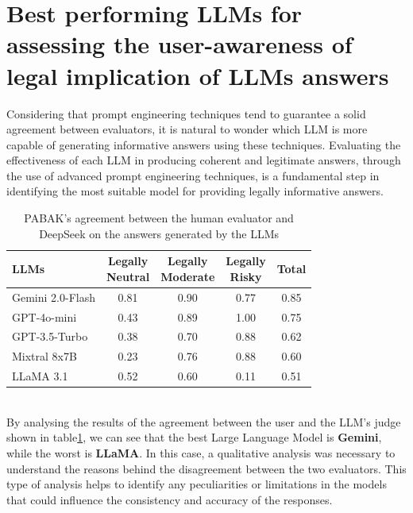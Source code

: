 \section{Best performing LLMs for assessing the user-awareness of legal implication of LLMs answers}
\label{sec:LLMwork}
Considering that prompt engineering techniques tend to guarantee a solid agreement between evaluators, it is natural to wonder which LLM is more capable of generating informative answers using these techniques. Evaluating the effectiveness of each LLM in producing coherent and legitimate answers, through the use of advanced prompt engineering techniques, is a fundamental step in identifying the most suitable model for providing legally informative answers.
\\
\begin{table}[ht]
    \centering
    \begin{tabular}{|l|c|c|c|c|}
        \hline
        \textbf{LLMs} & 
        \makecell{\textbf{Legally} \\ \textbf{Neutral}} & 
        \makecell{\textbf{Legally} \\ \textbf{Moderate}} & 
        \makecell{\textbf{Legally} \\ \textbf{Risky}} & 
        \textbf{Total} \\
        \hline
        Gemini 2.0-Flash & 0.81 & 0.90 & 0.77 & 0.85 \\
        \hline
        GPT-4o-mini      & 0.43 & 0.89 & 1.00 & 0.75 \\
        \hline
        GPT-3.5-Turbo    & 0.38 & 0.70 & 0.88 & 0.62 \\
        \hline
        Mixtral 8x7B     & 0.23 & 0.76 & 0.88 & 0.60 \\
        \hline
        LLaMA 3.1        & 0.52 & 0.60 & 0.11 & 0.51 \\
        \hline
    \end{tabular}
    \caption{PABAK's agreement between the human evaluator and DeepSeek on the answers generated by the LLMs}
    \label{tab:llm-performance}
\end{table}
\\
By analysing the results of the agreement between the user and the LLM's judge shown in table\ref{tab:llm-performance}, we can see that the best Large Language Model is \textbf{Gemini}, while the worst is \textbf{LLaMA}. In this case, a qualitative analysis was necessary to understand the reasons behind the disagreement between the two evaluators. This type of analysis helps to identify any peculiarities or limitations in the models that could influence the consistency and accuracy of the responses.
